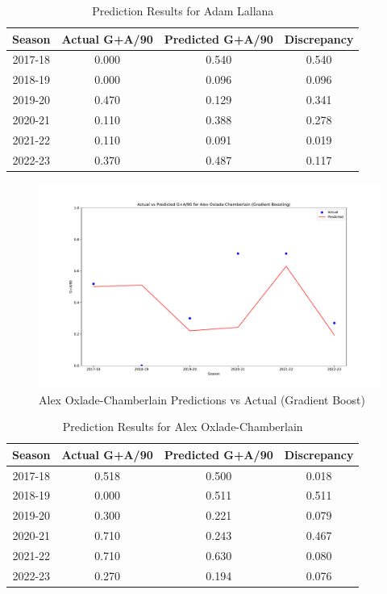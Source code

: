 \documentclass[12pt]{article}
\begin{document}

\begin{table}[h]
  \centering
  \begin{tabular}{|c|c|c|c|}
  \hline
  \textbf{Season} & \textbf{Actual G+A/90} & \textbf{Predicted G+A/90} & \textbf{Discrepancy} \\
  \hline
  2017-18 & 0.000 & 0.540 & 0.540 \\
  2018-19 & 0.000 & 0.096 & 0.096 \\
  2019-20 & 0.470 & 0.129 & 0.341 \\
  2020-21 & 0.110 & 0.388 & 0.278 \\
  2021-22 & 0.110 & 0.091 & 0.019 \\
  2022-23 & 0.370 & 0.487 & 0.117 \\
  \hline
  \end{tabular}
  \caption{Prediction Results for Adam Lallana}
  \label{tab:lallana_prediction_results}
\end{table}


\begin{figure}[H]
  \centering
  \includegraphics[width=1\textwidth]{GradBoost_Chamberlain.pdf}
  \caption{Alex Oxlade-Chamberlain Predictions vs Actual (Gradient Boost)}
  \label{fig:Chamberlain_graph}
  \end{figure}


\begin{table}[h]
  \centering
  \begin{tabular}{|c|c|c|c|}
  \hline
  \textbf{Season} & \textbf{Actual G+A/90} & \textbf{Predicted G+A/90} & \textbf{Discrepancy} \\
  \hline
  2017-18 & 0.518 & 0.500 & 0.018 \\
  2018-19 & 0.000 & 0.511 & 0.511 \\
  2019-20 & 0.300 & 0.221 & 0.079 \\
  2020-21 & 0.710 & 0.243 & 0.467 \\
  2021-22 & 0.710 & 0.630 & 0.080 \\
  2022-23 & 0.270 & 0.194 & 0.076 \\
  \hline
  \end{tabular}
  \caption{Prediction Results for Alex Oxlade-Chamberlain}
  \label{tab:oxlade_chamberlain_prediction_results}
\end{table}
\end{document}

